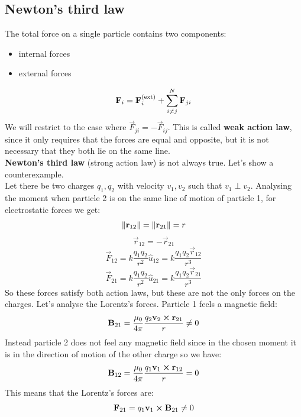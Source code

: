 \subsection{Newton's third law}
The total force on a single particle contains two components:
\begin{itemize}
    \item internal forces
    \item external forces
\end{itemize}
\begin{equation}
    \vb{F}_i = \vb{F}_i^{(\mathrm{ext})} + \displaystyle\sum_{i\neq j}^{N}\vb{F}_{ji}
\end{equation}
We will restrict to the case where $\vec{F}_{ji} = -\vec{F}_{ij}$. This is called \textbf{weak action law}, since it only requires that the forces are equal and opposite, but it is not necessary that they both lie on the same line.\\
\textbf{Newton's third law} (strong action law) is not always true. Let's show a counterexample.\\
Let there be two charges $q_1,q_2$ with velocity $v_1,v_2$ such that $v_1\perp v_2$. Analysing the moment when particle 2 is on the same line of motion of particle 1, for electrostatic forces we get:
\[\norm{\vb{r}_{12}} = \norm{\vb{r}_{21}} = r\]
\[\vec{r}_{12} = - \vec{r}_{21}\]
\begin{equation}
    \vec{F}_{12} = k\dfrac{q_1q_2}{r^2}\hat{u}_{12} = k\dfrac{q_1q_2 \vec{r}_{12}}{r^3}
\end{equation}
\begin{equation}
    \vec{F}_{21} = k\dfrac{q_1q_2}{r^2}\hat{u}_{21} = k\dfrac{q_1q_2 \vec{r}_{21}}{r^3}
\end{equation}
So these forces satisfy both action laws, but these are not the only forces on the charges. Let's analyse the Lorentz's forces. Particle 1 feels a magnetic field:
\begin{equation}
    \vb{B}_{21} = \dfrac{\mu_0}{4\pi}\dfrac{q_2\vb{v}_2\cross\vb{r}_{21}}{r} \neq 0
\end{equation}
Instead particle 2 does not feel any magnetic field since in the chosen moment it is in the direction of motion of the other charge so we have:
\begin{equation}
    \vb{B}_{12} = \dfrac{\mu_0}{4\pi}\dfrac{q_1\vb{v}_1\cross\vb{r}_{12}}{r} = 0
\end{equation}
This means that the Lorentz's forces are:
\begin{equation}
    \vb{F}_{21} = q_1\vb{v}_1\cross\vb{B}_{21} \neq 0
\end{equation}

